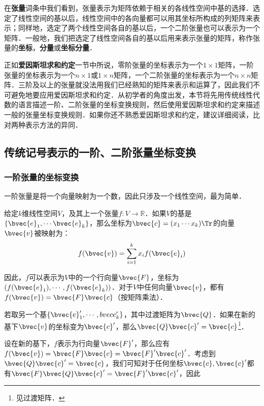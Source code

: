 

在\textbf{张量}词条中我们看到，张量表示为矩阵依赖于相关的各线性空间中基的选择．选定了线性空间的基以后，线性空间中的各向量都可以用其坐标所构成的列矩阵来表示；同样地，选定了两个线性空间各自的基以后，一个二阶张量也可以表示为一个矩阵．一般地，我们把选定了线性空间各自的基以后用来表示张量的矩阵，称作张量的\textbf{坐标}，\textbf{分量}或\textbf{坐标分量}．

正如\textbf{爱因斯坦求和约定}一节中所说，零阶张量的坐标表示为一个$1\times 1$矩阵，一阶张量的坐标表示为一个$n\times 1$或$1\times n$矩阵，一个二阶张量的坐标表示为一个$n\times n$矩阵．三阶及以上的张量就没法用我们已经熟知的矩阵来表示和运算了，因此我们不可避免地要应用爱因斯坦求和约定．从初学者的角度出发，本节将先用传统线性代数的语言描述一阶、二阶张量的坐标变换规则，然后使用爱因斯坦求和约定来描述一般的张量坐标变换规则．如果你还不熟悉爱因斯坦求和约定，建议详细阅读，比对两种表示方法的异同．

\subsection{传统记号表示的一阶、二阶张量坐标变换}
\subsubsection{一阶张量的坐标变换}
一阶张量是将一个向量映射为一个数，因此只涉及一个线性空间，最为简单．

给定$k$维线性空间$V$，及其上一个张量$f:V\rightarrow\mathbb{R}$．如果$V$的基是$\{\bvec{e}_1, \cdots\bvec{e}_k\}$，那么坐标为$\bvec{c}=(x_1\cdots x_k)\Tr$的向量$\bvec{v}$被映射为：
\begin{equation}
f(\bvec{v})=\sum\limits_{i=1}^k x_if(\bvec{e}_i)
\end{equation}

因此，$f$可以表示为$V$中的一个行向量$\bvec{F}$，坐标为$(f(\bvec{e}_1), \cdots, f(\bvec{e}_k))$．对于$V$中任何向量$\bvec{v}$，都有$f(\bvec{v})=\bvec{F}\bvec{c}$（按矩阵乘法）．

若取另一个基$\{\bvec{e}_1', \cdots, \\bvec{e}_k'\}$，其中过渡矩阵为$\bvec{Q}$．如果在新的基下$\bvec{v}$的坐标变为$\bvec{c}'$，那么$\bvec{Q}\bvec{c}'=\bvec{c}$\footnote{见过渡矩阵．}．

设在新的基下，$f$表示为行向量$\bvec{F}'$，那么应有$f(\bvec{v})=\bvec{F}\bvec{c}=\bvec{F}'\bvec{c}'$．考虑到$\bvec{Q}\bvec{c}'=\bvec{c}$，我们可知对于任何坐标$\bvec{c}, \bvec{c}'$都有$\bvec{F}\bvec{Q}\bvec{c}'=\bvec{F}'\bvec{c}'$，因此

